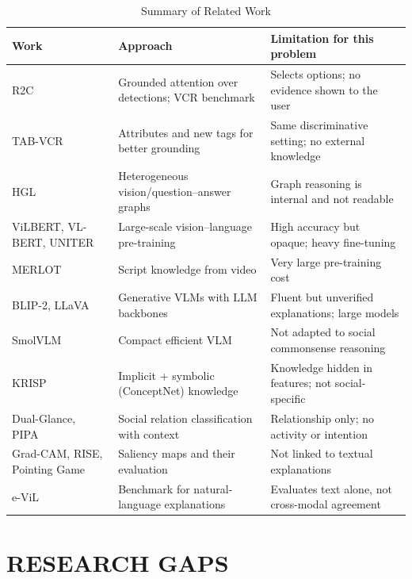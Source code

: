 \begin{table}[h!]
\centering
\caption{Summary of Related Work}
\label{tab:litsummary}
\small
\renewcommand{\arraystretch}{1.3}
\begin{tabularx}{\textwidth}{|p{3.2cm}|p{4.3cm}|L|}
\hline
\textbf{Work} & \textbf{Approach} & \textbf{Limitation for this problem}\\ \hline
R2C~\cite{zellers2019vcr} & Grounded attention over detections; VCR benchmark & Selects options; no evidence shown to the user \\ \hline
TAB-VCR~\cite{lin2019tabvcr} & Attributes and new tags for better grounding & Same discriminative setting; no external knowledge \\ \hline
HGL~\cite{yu2019hgl} & Heterogeneous vision/question--answer graphs & Graph reasoning is internal and not readable \\ \hline
ViLBERT, VL-BERT, UNITER~\cite{lu2019vilbert,su2020vlbert,chen2020uniter} & Large-scale vision--language pre-training & High accuracy but opaque; heavy fine-tuning \\ \hline
MERLOT~\cite{zellers2021merlot} & Script knowledge from video & Very large pre-training cost \\ \hline
BLIP-2, LLaVA~\cite{li2023blip2,liu2023llava} & Generative VLMs with LLM backbones & Fluent but unverified explanations; large models \\ \hline
SmolVLM~\cite{marafioti2025smolvlm} & Compact efficient VLM & Not adapted to social commonsense reasoning \\ \hline
KRISP~\cite{marino2021krisp} & Implicit + symbolic (ConceptNet) knowledge & Knowledge hidden in features; not social-specific \\ \hline
Dual-Glance, PIPA~\cite{li2017dualglance,sun2017domain} & Social relation classification with context & Relationship only; no activity or intention \\ \hline
Grad-CAM, RISE, Pointing Game~\cite{selvaraju2017gradcam,petsiuk2018rise,zhang2018excitation} & Saliency maps and their evaluation & Not linked to textual explanations \\ \hline
e-ViL~\cite{kayser2021evil} & Benchmark for natural-language explanations & Evaluates text alone, not cross-modal agreement \\ \hline
\end{tabularx}
\end{table}

\section{RESEARCH GAPS}

